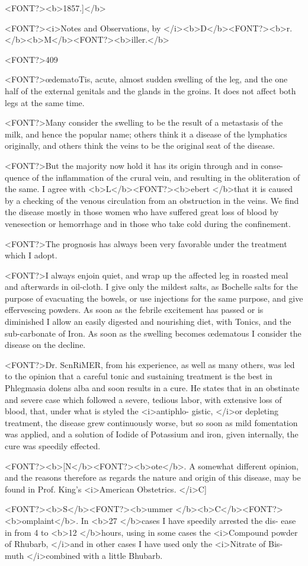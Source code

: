 <FONT?><b>1857.]</b>

<FONT?><i>Notes and Observations, by </i><b>D</b><FONT?><b>r. </b><b>M</b><FONT?><b>iller.</b>

<FONT?>409

<FONT?>œdematoTis, acute, almost sudden swelling of the leg, and the one half
of the external genitals and the glands in the groins. It does not
affect both legs at the same time.

<FONT?>Many consider the swelling to be the result of a metastasis of the
milk, and hence the popular name; others think it a disease of the
lymphatics originally, and others think the veins to be the original
seat of the disease.

<FONT?>But the majority now hold it has its origin through and in conse-
quence of the inflammation of the crural vein, and resulting in the
obliteration of the same. I agree with <b>L</b><FONT?><b>ebert </b>that it is caused by a
checking of the venous circulation from an obstruction in the veins.
We find the disease mostly in those women who have suffered great
loss of blood by venesection or hemorrhage and in those who take cold
during the confinement.

<FONT?>The prognosis has always been very favorable under the treatment
which I adopt.

<FONT?>I always enjoin quiet, and wrap up the affected leg in roasted meal
and afterwards in oil-cloth. I give only the mildest salts, as Bochelle
salts for the purpose of evacuating the bowels, or use injections for
the same purpose, and give effervescing powders. As soon as the
febrile excitement has passed or is diminished I allow an easily digested
and nourishing diet, with Tonics, and the sub-carbonate of Iron. As
soon as the swelling becomes œdematous I consider the disease on the
decline.

<FONT?>Dr. ScnRiMER, from his experience, as well as many others, was led
to the opinion that a careful tonic and sustaining treatment is the best
in Phlegmasia dolens alba and soon results in a cure. He states that
in an obstinate and severe case which followed a severe, tedious labor,
with extensive loss of blood, that, under what is styled the <i>antiphlo-
gistic, </i>or depleting treatment, the disease grew continuously worse, but
so soon as mild fomentation was applied, and a solution of Iodide of
Potassium and iron, given internally, the cure was speedily effected.

<FONT?><b>[N</b><FONT?><b>ote</b>. A somewhat different opinion, and the reasons therefore as
regards the nature and origin of this disease, may be found in Prof.
King's <i>American Obstetrics. </i>C]

<FONT?><b>S</b><FONT?><b>ummer </b><b>C</b><FONT?><b>omplaint</b>. In <b>27 </b>cases I have speedily arrested the dis-
ease in from 4 to <b>12 </b>hours, using in some cases the <i>Compound powder
of Rhubarb, </i>and in other cases I have used only the <i>Nitrate of Bis-
muth </i>combined with a little Bhubarb.\endinput
